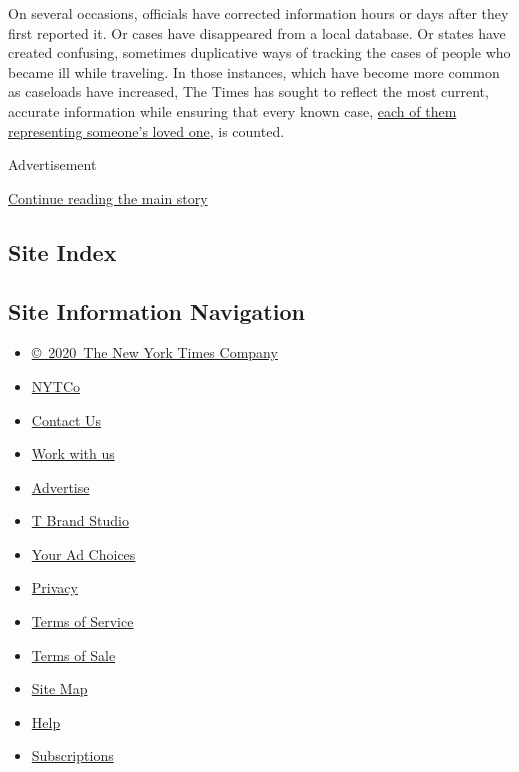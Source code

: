 On several occasions, officials have corrected information hours or days
after they first reported it. Or cases have disappeared from a local
database. Or states have created confusing, sometimes duplicative ways
of tracking the cases of people who became ill while traveling. In those
instances, which have become more common as caseloads have increased,
The Times has sought to reflect the most current, accurate information
while ensuring that every known case,
\href{https://www.nytimes3xbfgragh.onion/2020/03/22/us/coronavirus-deaths-united-states.html}{each
of them representing someone's loved one}, is counted.

Advertisement

\protect\hyperlink{after-bottom}{Continue reading the main story}

\hypertarget{site-index}{%
\subsection{Site Index}\label{site-index}}

\hypertarget{site-information-navigation}{%
\subsection{Site Information
Navigation}\label{site-information-navigation}}

\begin{itemize}
\tightlist
\item
  \href{https://help.nytimes3xbfgragh.onion/hc/en-us/articles/115014792127-Copyright-notice}{©~2020~The
  New York Times Company}
\end{itemize}

\begin{itemize}
\tightlist
\item
  \href{https://www.nytco.com/}{NYTCo}
\item
  \href{https://help.nytimes3xbfgragh.onion/hc/en-us/articles/115015385887-Contact-Us}{Contact
  Us}
\item
  \href{https://www.nytco.com/careers/}{Work with us}
\item
  \href{https://nytmediakit.com/}{Advertise}
\item
  \href{http://www.tbrandstudio.com/}{T Brand Studio}
\item
  \href{https://www.nytimes3xbfgragh.onion/privacy/cookie-policy\#how-do-i-manage-trackers}{Your
  Ad Choices}
\item
  \href{https://www.nytimes3xbfgragh.onion/privacy}{Privacy}
\item
  \href{https://help.nytimes3xbfgragh.onion/hc/en-us/articles/115014893428-Terms-of-service}{Terms
  of Service}
\item
  \href{https://help.nytimes3xbfgragh.onion/hc/en-us/articles/115014893968-Terms-of-sale}{Terms
  of Sale}
\item
  \href{https://spiderbites.nytimes3xbfgragh.onion}{Site Map}
\item
  \href{https://help.nytimes3xbfgragh.onion/hc/en-us}{Help}
\item
  \href{https://www.nytimes3xbfgragh.onion/subscription?campaignId=37WXW}{Subscriptions}
\end{itemize}
